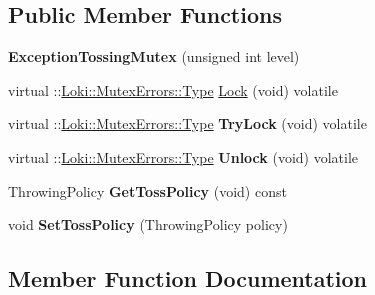 \subsection*{Public Member Functions}
\begin{DoxyCompactItemize}
\item 
\hypertarget{classExceptionTossingMutex_a17a8466a8f86e5a9c7eb065672bf43d8}{}{\bfseries Exception\+Tossing\+Mutex} (unsigned int level)\label{classExceptionTossingMutex_a17a8466a8f86e5a9c7eb065672bf43d8}

\item 
virtual \+::\hyperlink{classLoki_1_1MutexErrors_acd0eb6065ca303083d2e0229d7bff590}{Loki\+::\+Mutex\+Errors\+::\+Type} \hyperlink{classExceptionTossingMutex_adece71b07180b983a301504b1417ff36}{Lock} (void) volatile
\item 
\hypertarget{classExceptionTossingMutex_aba4c1c2c65e52422ae902d89a9ce006a}{}virtual \+::\hyperlink{classLoki_1_1MutexErrors_acd0eb6065ca303083d2e0229d7bff590}{Loki\+::\+Mutex\+Errors\+::\+Type} {\bfseries Try\+Lock} (void) volatile\label{classExceptionTossingMutex_aba4c1c2c65e52422ae902d89a9ce006a}

\item 
\hypertarget{classExceptionTossingMutex_a4725934cc36c0f7002f2d8e375deb77c}{}virtual \+::\hyperlink{classLoki_1_1MutexErrors_acd0eb6065ca303083d2e0229d7bff590}{Loki\+::\+Mutex\+Errors\+::\+Type} {\bfseries Unlock} (void) volatile\label{classExceptionTossingMutex_a4725934cc36c0f7002f2d8e375deb77c}

\item 
\hypertarget{classExceptionTossingMutex_aaf8b0be03ad53508ec5ddea9940a248e}{}Throwing\+Policy {\bfseries Get\+Toss\+Policy} (void) const \label{classExceptionTossingMutex_aaf8b0be03ad53508ec5ddea9940a248e}

\item 
\hypertarget{classExceptionTossingMutex_a914286af940025e4eed63f77295c2f60}{}void {\bfseries Set\+Toss\+Policy} (Throwing\+Policy policy)\label{classExceptionTossingMutex_a914286af940025e4eed63f77295c2f60}

\end{DoxyCompactItemize}


\subsection{Member Function Documentation}
\hypertarget{classExceptionTossingMutex_adece71b07180b983a301504b1417ff36}{}
